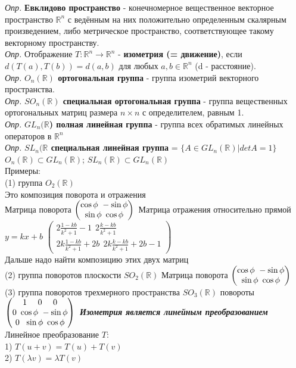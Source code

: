 \documentclass[12pt, oneside]{book}
\theoremstyle{definition}
\newcommand{\bb}[1]{\mathbb{#1}}
\begin{document}
\begin{enumerate}
\textit{Опр.} \textbf{Евклидово пространство} - конечномерное вещественное векторное пространство $\mathbb{R}^n$ с ведённым на них положительно определенным скалярным произведением, либо метрическое пространство, соответствующее такому векторному пространству. \\
\textit{Опр.} Отображение $T: \mathbb{R}^n \rightarrow \mathbb{R}^n$ - \textbf{изометрия (= движение)}, если $d(T(a), T(b)) = d(a, b)$ для любых $a, b \in \mathbb{R}^n$ (d - расстояние).\\
\textit{Опр.} \textbf{$O_n(\mathbb{R})$ ортогональная группа} - группа изометрий векторного пространства.\\
\textit{Опр.} \textbf{$SO_n(\mathbb{R})$ специальная ортогональная группа} - группа вещественных ортогональных матриц размера $n \times n$ с определителем, равным 1. \\
\textit{Опр.} \textbf{$GL_n(\mathbb{R}$) полная линейная группа} - группа всех обратимых линейных операторов в $\mathbb{R}^n$ \\
\textit{Опр.} \textbf{$SL_n(\mathbb{R}$ специальная линейная группа} = $\{ A \in GL_n(\mathbb{R}) | det A = 1 \}$\\
$O_n(\mathbb{R}) \subset GL_n(\mathbb{R})$; $SL_n(\mathbb{R}) \subset GL_n(\mathbb{R})$ \\
Примеры: \\
(1) группа $O_2(\bb{R})$ \\
Это композиция поворота и отражения 
\\
Матрица поворота
$\begin{pmatrix}
     \cos{\phi} \ -\sin{\phi}\\
     \sin{\phi} \ \cos{\phi} 
\end{pmatrix} \\$
Матрица отражения относительно прямой $y = kx + b$
$\begin{pmatrix}
    2\frac{1 - kb}{k^2 + 1}-1 \ \ 2\frac{k - kb}{k^2 + 1} \\
    2k\frac{1 - kb}{k^2 + 1}+2b \ \ 2k\frac{k - kb}{k^2 +1}+2b-1
\end{pmatrix}$ \\
Дальше надо найти композицию этих двух матриц
\\(2) группа поворотов плоскости $SO_2(\bb{R})$ 
Матрица поворота
$\begin{pmatrix}
     \cos{\phi} \ -\sin{\phi}\\
     \sin{\phi} \ \cos{\phi} 
\end{pmatrix} \\$
(3) группа поворотов трехмерного пространства $SO_3(\bb{R})$ 
повороты
$\begin{pmatrix}
    1 \ \ \ \ 0 \ \ \ \ 0 \\
    0 \ \cos{\phi} \ -\sin{\phi} \\
    0 \ \ \sin{\phi} \ \cos{\phi}
\end{pmatrix} \\ $
\textit{\textbf{Изометрия является линейным преобразованием}}\\
Линейное преобразование $T$:\\
1) $T(u + v) = T(u) + T(v)$\\
2) $T(\lambda v) = \lambda T(v)$



\end{enumerate}
\end{document}
